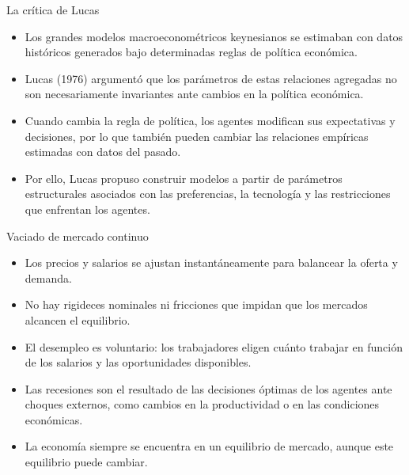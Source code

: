 \documentclass[aspectratio=169,11pt]{beamer}
\begin{document}
\begin{frame}{La crítica de Lucas}
  \begin{itemize}
    \setlength{\itemsep}{0.55em}

    \item Los grandes modelos macroeconométricos keynesianos se estimaban con datos históricos generados bajo determinadas reglas de política económica.

    \item Lucas (1976) argumentó que los parámetros de estas relaciones agregadas no son necesariamente invariantes ante cambios en la política económica.

    \item Cuando cambia la regla de política, los agentes modifican sus expectativas y decisiones, por lo que también pueden cambiar las relaciones empíricas estimadas con datos del pasado.

    \item Por ello, Lucas propuso construir modelos a partir de parámetros estructurales asociados con las preferencias, la tecnología y las restricciones que enfrentan los agentes.
  \end{itemize}
\end{frame}


\begin{frame}{Vaciado de mercado continuo}
  \begin{itemize}
    \item Los precios y salarios se ajustan instantáneamente para balancear la oferta y demanda.
    \item No hay rigideces nominales ni fricciones que impidan que los mercados alcancen el equilibrio.
    \item El desempleo es voluntario: los trabajadores eligen cuánto trabajar en función de los salarios y las oportunidades disponibles.
    \item Las recesiones son el resultado de las decisiones óptimas de los agentes ante choques externos, como cambios en la productividad o en las condiciones económicas.
    \item La economía siempre se encuentra en un equilibrio de mercado, aunque este equilibrio puede cambiar.
  \end{itemize} 
\end{frame}
\end{document}

